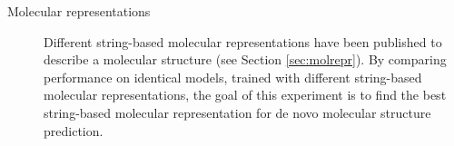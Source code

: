 \begin{description}
    \item[Molecular representations]
    Different string-based molecular representations have been published to describe a molecular structure (see Section \ref{sec:molrepr}).
    By comparing performance on identical models, trained with different string-based molecular representations,
    the goal of this experiment is to find the best string-based molecular representation for de novo molecular structure prediction.
     
\end{description}

